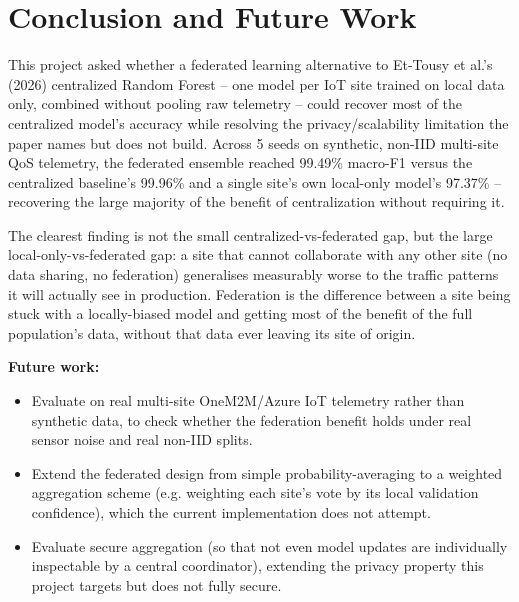 
\section{Conclusion and Future Work}
\label{sec:Conclusion}

This project asked whether a federated learning alternative to Et-Tousy et al.'s (2026) centralized Random Forest -- one model per IoT site trained on local data only, combined without pooling raw telemetry -- could recover most of the centralized model's accuracy while resolving the privacy/scalability limitation the paper names but does not build. Across 5 seeds on synthetic, non-IID multi-site QoS telemetry, the federated ensemble reached 99.49\% macro-F1 versus the centralized baseline's 99.96\% and a single site's own local-only model's 97.37\% -- recovering the large majority of the benefit of centralization without requiring it.

The clearest finding is not the small centralized-vs-federated gap, but the large local-only-vs-federated gap: a site that cannot collaborate with any other site (no data sharing, no federation) generalises measurably worse to the traffic patterns it will actually see in production. Federation is the difference between a site being stuck with a locally-biased model and getting most of the benefit of the full population's data, without that data ever leaving its site of origin.

\textbf{Future work:}
\begin{itemize}
  \item Evaluate on real multi-site OneM2M/Azure IoT telemetry rather than synthetic data, to check whether the federation benefit holds under real sensor noise and real non-IID splits.
  \item Extend the federated design from simple probability-averaging to a weighted aggregation scheme (e.g. weighting each site's vote by its local validation confidence), which the current implementation does not attempt.
  \item Evaluate secure aggregation (so that not even model updates are individually inspectable by a central coordinator), extending the privacy property this project targets but does not fully secure.
\end{itemize}
